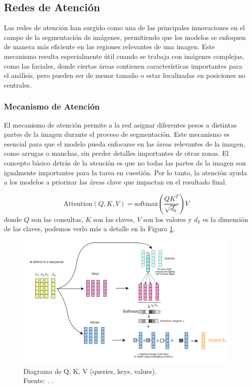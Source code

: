 \subsection{Redes de Atención}  
Las redes de atención han surgido como una de las principales innovaciones en el campo de la segmentación de imágenes, permitiendo que los modelos se enfoquen de manera más eficiente en las regiones relevantes de una imagen. Este mecanismo resulta especialmente útil cuando se trabaja con imágenes complejas, como las faciales, donde ciertas áreas contienen características importantes para el análisis, pero pueden ser de menor tamaño o estar localizadas en posiciones no centrales.

\subsubsection{Mecanismo de Atención}  
El mecanismo de atención permite a la red asignar diferentes pesos a distintas partes de la imagen durante el proceso de segmentación. Este mecanismo es esencial para que el modelo pueda enfocarse en las áreas relevantes de la imagen, como arrugas o manchas, sin perder detalles importantes de otras zonas. El concepto básico detrás de la atención es que no todas las partes de la imagen son igualmente importantes para la tarea en cuestión. Por lo tanto, la atención ayuda a los modelos a priorizar las áreas clave que impactan en el resultado final.  

\begin{equation}\label{eq:atencion}
    \text{Attention}(Q, K, V) = \text{softmax}\left(\frac{QK^T}{\sqrt{d_k}}\right)V
\end{equation}
donde $Q$ son las consultas, $K$ son las claves, $V$ son los valores y $d_k$ es la dimensión de las claves, podemos verlo más a detalle en la Figura \ref{2:figeqbasmat}.

\begin{figure}[H]
	\begin{center}
		\includegraphics[width=1\textwidth]{2/figures/eqbasmat.png}
		\caption[Diagrama de Q, K, V (queries, keys, values)]{Diagrama de Q, K, V (queries, keys, values).\\
		Fuente: \cite{vaswani2025transformers}. .}
		\label{2:figeqbasmat}
	\end{center}
\end{figure}

